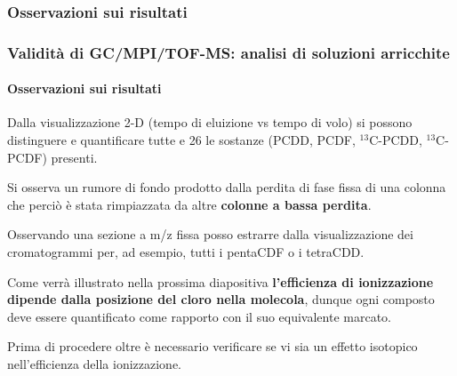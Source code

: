 \subsubsection{Osservazioni sui risultati}\begin{frame}\frametitle{Validità di GC/MPI/TOF-MS: analisi di soluzioni arricchite}\framesubtitle{Osservazioni sui risultati}
Dalla visualizzazione 2-D (tempo di eluizione vs tempo di volo) si possono distinguere e quantificare tutte e 26 le sostanze (PCDD, PCDF, $^{13}$C-PCDD, $^{13}$C-PCDF) presenti.\pause

Si osserva un rumore di fondo prodotto dalla perdita di fase fissa di una colonna che perciò è stata rimpiazzata da altre {\bf colonne a bassa perdita}.

Osservando una sezione a m/z fissa posso estrarre dalla visualizzazione dei cromatogrammi per, ad esempio, tutti i pentaCDF o i tetraCDD.\pause

Come verrà illustrato nella prossima diapositiva {\bf l'efficienza di ionizzazione dipende dalla posizione del cloro nella molecola}, dunque ogni composto deve essere quantificato come rapporto con il suo equivalente marcato.
 
Prima di procedere oltre è necessario verificare se vi sia un effetto isotopico nell'efficienza della ionizzazione.
\end{frame}



